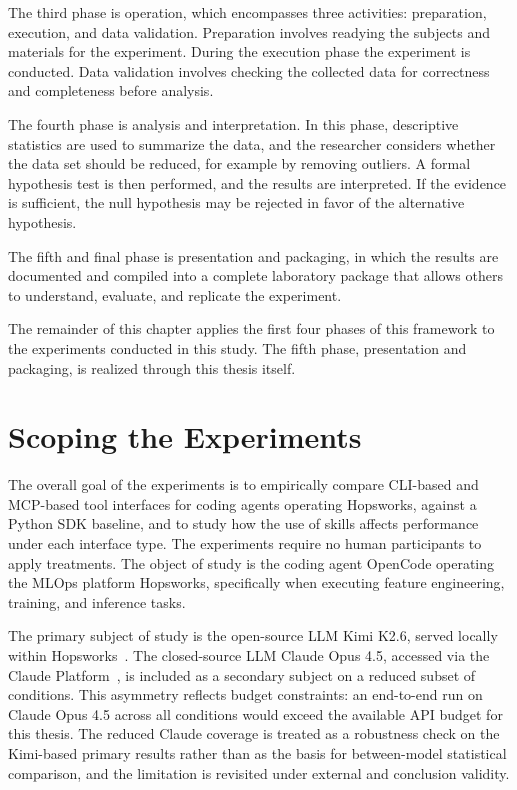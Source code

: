 \documentclass[
english,                 %
bibtex,                  %
includeExtraAbstracts, %
]{kththesis}
\numberwithin{listing}{chapter}
\begin{document}
The third phase is operation, which encompasses three activities: preparation, execution, and data validation. Preparation involves readying the subjects and materials for the experiment. During the execution phase the experiment is conducted. Data validation involves checking the collected data for correctness and completeness before analysis.

The fourth phase is analysis and interpretation. In this phase, descriptive statistics are used to summarize the data, and the researcher considers whether the data set should be reduced, for example by removing outliers. A formal hypothesis test is then performed, and the results are interpreted. If the evidence is sufficient, the null hypothesis may be rejected in favor of the alternative hypothesis.

The fifth and final phase is presentation and packaging, in which the results are documented and compiled into a complete laboratory package that allows others to understand, evaluate, and replicate the experiment.

The remainder of this chapter applies the first four phases of this framework to the experiments conducted in this study. The fifth phase, presentation and packaging, is realized through this thesis itself.

\section{Scoping the Experiments}

The overall goal of the experiments is to empirically compare \gls{CLI}-based and \gls{MCP}-based tool interfaces for coding agents operating Hopsworks, against a Python \gls{SDK} baseline, and to study how the use of skills affects performance under each interface type. The experiments require no human participants to apply treatments. The object of study is the coding agent OpenCode operating the \gls{MLOps} platform Hopsworks, specifically when executing feature engineering, training, and inference tasks.

The primary subject of study is the open-source \gls{LLM} Kimi K2.6, served locally within Hopsworks~\cite{kimi_team_kimi_2026}. The closed-source \gls{LLM} Claude Opus 4.5, accessed via the Claude Platform~\cite{anthropic_pbc_introducing_2025}, is included as a secondary subject on a reduced subset of conditions. This asymmetry reflects budget constraints: an end-to-end run on Claude Opus 4.5 across all conditions would exceed the available \gls{API} budget for this thesis. The reduced Claude coverage is treated as a robustness check on the Kimi-based primary results rather than as the basis for between-model statistical comparison, and the limitation is revisited under external and conclusion validity.
\end{document}
